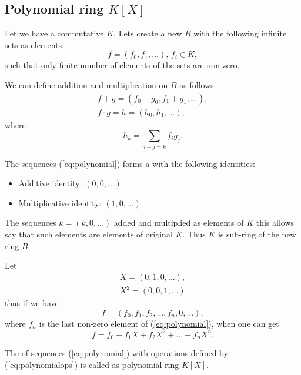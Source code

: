 \begin{appendices}
\subsection{Polynomial ring $K\left[X\right]$}

Let we have a commutative  $K$. Lets create a new
 $B$ with the following infinite sets as elements:
\begin{equation}
  f = \left(f_0, f_1, \dots \right), \, f_i \in K,
  \label{eq:polynomial}
\end{equation}
such that only finite number of elements of the sets are non zero.

We can define addition and multiplication on $B$ as follows
\begin{eqnarray}
  f + g = \left(f_0 + g_0, f_1 + g_1, \dots \right),
  \nonumber \\
  f \cdot g = h = \left(h_0, h_1, \dots \right),
  \label{eq:polynomialops}
\end{eqnarray}
where
\[
h_k = \sum_{i + j =k} f_i g_j. 
\]

The sequences (\ref{eq:polynomial}) forms a  with
the following identities:
\begin{itemize}
\item Additive identity: $\left(0, 0, \dots \right)$
\item Multiplicative identity: $\left(1, 0, \dots \right)$
\end{itemize}

The
sequences $k = \left(k, 0, \dots \right)$ added and multiplied as
elements of $K$ this allows say that such elements are elements of
original  $K$. Thus $K$ is sub-ring of the new ring
$B$.

Let
\begin{eqnarray}
  X = \left(0, 1, 0, \dots \right),
  \nonumber \\
  X^2 = \left(0, 0, 1, \dots \right)
  \nonumber
\end{eqnarray}
thus if we have
\[
f = \left(f_0, f_1, f_2, \dots, f_n, 0, \dots \right),
\]
where $f_n$ is the last non-zero element of (\ref{eq:polynomial}),
when one can get
\[
f = f_0 + f_1 X + f_2 X^2 + \dots + f_n X^n.
\]

\begin{definition}
  The  of sequences (\ref{eq:polynomial}) with
  operations defined by (\ref{eq:polynomialops}) is called as
  polynomial ring $K\left[X\right]$.
  \label{def:polynomial}
\end{definition}


\end{appendices}
